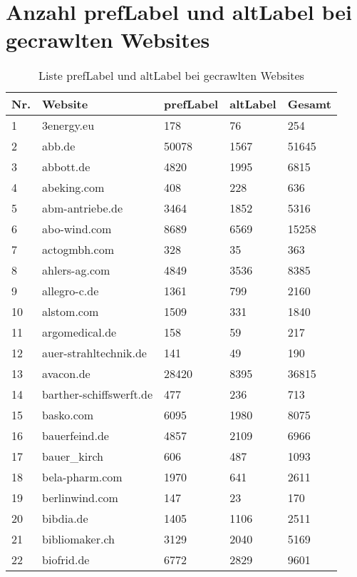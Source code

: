 %
\section{Anzahl prefLabel und altLabel bei gecrawlten Websites}\label{sec:listelabel}
\begin{longtable}{|m{0.5cm}|m{5cm}|m{2cm}|m{2cm}|m{2cm}|}
	\caption{Liste prefLabel und altLabel bei gecrawlten Websites}\label{tbl:label}\\%
	\hline
	\textbf{Nr.} & \textbf{Website} & \textbf{prefLabel} & \textbf{altLabel} & \textbf{Gesamt} \\
	\hline \hline
	1 & 3energy.eu & 178 & 76 & 254\\
	\hline
	2 & abb.de & 50078 & 1567 & 51645\\
	\hline
	3 & abbott.de & 4820 & 1995 & 6815\\
	\hline
	4 & abeking.com & 408 & 228 & 636\\
	\hline
	5 & abm-antriebe.de & 3464 & 1852 & 5316\\
	\hline
	6 & abo-wind.com & 8689 & 6569 & 15258\\
	\hline
	7 & actogmbh.com & 328 & 35 & 363\\
	\hline
	8 & ahlers-ag.com & 4849 & 3536 & 8385\\
	\hline
	9 & allegro-c.de & 1361 & 799 & 2160\\
	\hline
	10 & alstom.com & 1509 & 331 & 1840\\
	\hline
	11 & argomedical.de & 158 & 59 & 217\\
	\hline
	12 & auer-strahltechnik.de & 141 & 49 & 190\\
	\hline
	13 & avacon.de & 28420 & 8395 & 36815\\
	\hline
	14 & barther-schiffswerft.de & 477 & 236 & 713\\
	\hline
	15 & basko.com & 6095 & 1980 & 8075\\
	\hline
	16 & bauerfeind.de & 4857 & 2109 & 6966\\
	\hline
	17 & bauer\_kirch & 606 & 487 & 1093\\
	\hline
	18 & bela-pharm.com & 1970 & 641 & 2611\\
	\hline
	19 & berlinwind.com & 147 & 23 & 170\\
	\hline
	20 & bibdia.de & 1405 & 1106 & 2511\\
	\hline
	21 & bibliomaker.ch & 3129 & 2040 & 5169\\
	\hline
	22 & biofrid.de & 6772 & 2829 & 9601\\

\end{longtable}
